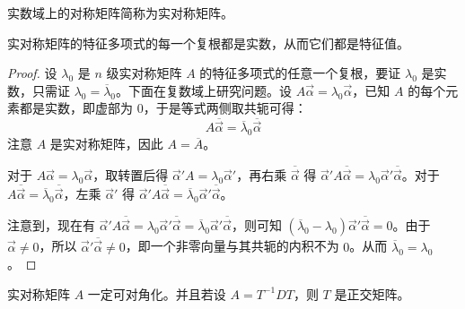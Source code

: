 实数域上的对称矩阵简称为实对称矩阵。

\begin{theorem}
	实对称矩阵的特征多项式的每一个复根都是实数，从而它们都是特征值。
\end{theorem}

\begin{proof}
	设 $\lambda_0$ 是 $n$ 级实对称矩阵 $A$ 的特征多项式的任意一个复根，要证 $\lambda_0$ 是实数，只需证 $\lambda_0 = \overline \lambda_0$。下面在复数域上研究问题。设 $A \vec \alpha = \lambda_0 \vec \alpha$，已知 $A$ 的每个元素都是实数，即虚部为 $0$，于是等式两侧取共轭可得：
	$$
	A \overline{\vec \alpha} = \overline \lambda_0 \overline{\vec \alpha}
	$$
	注意 $A$ 是实对称矩阵，因此 $A = \overline A$。

	对于 $A \vec \alpha = \lambda_0 \vec \alpha$，取转置后得 $\vec \alpha' A = \lambda_0 \vec \alpha'$，再右乘 $\overline{\vec \alpha}$ 得 $\vec \alpha' A \overline{\vec \alpha} = \lambda_0 \vec \alpha' \overline{\vec \alpha}$。对于 $A \overline{\vec \alpha} = \overline \lambda_0 \overline{\vec \alpha}$，左乘 $\vec \alpha'$ 得 $\vec \alpha' A \overline{\vec \alpha} = \overline \lambda_0 \vec \alpha' \overline{\vec \alpha}$。

	注意到，现在有 $\vec \alpha' A \overline{\vec \alpha} = \lambda_0 \vec \alpha' \overline{\vec \alpha} = \overline \lambda_0 \vec \alpha' \overline{\vec \alpha}$，则可知 $(\overline \lambda_0 - \lambda_0) \vec \alpha' \overline{\vec \alpha} = 0$。由于 $\vec \alpha \ne 0$，所以 $\vec \alpha' \overline{\vec \alpha} \ne 0$，即一个非零向量与其共轭的内积不为 $0$。从而 $\overline \lambda_0 = \lambda_0$。
\end{proof}

\begin{theorem}
	实对称矩阵 $A$ 一定可对角化。并且若设 $A = T^{-1} D T$，则 $T$ 是正交矩阵。
\end{theorem}


